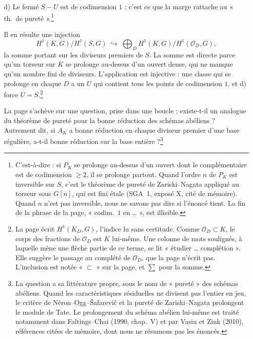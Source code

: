 \documentclass[11pt,a4paper]{article}
\begin{document}
d) Le fermé $S - U$ est de codimension $1$ : c'est ce que la marge rattache au
« th.\ de pureté ».\footnote{C'est-à-dire : si $P_K$ se prolonge au-dessus d'un
ouvert dont le complémentaire est de codimension $\geq 2$, il se prolonge
partout. Quand l'ordre $n$ de $P_K$ est inversible sur $S$, c'est le théorème de
pureté de Zariski--Nagata appliqué au torseur sous $G[n]$, qui est fini étale
(SGA~1, exposé X, cité de mémoire). Quand $n$ n'est pas inversible, nous ne
savons pas dire si l'énoncé tient. La fin de la phrase de la page,
« codim.~$1$ en … », est illisible.}

Il en résulte une injection
\[
  H^{1}(K, G) / H^{1}(S, G) \;\hookrightarrow\;
  \bigoplus_{D} H^{1}(K, G) / H^{1}(\mathcal{O}_D, G),
\]
la somme portant sur les diviseurs premiers de $S$. La somme est directe parce
qu'un torseur sur $K$ se prolonge au-dessus d'un ouvert dense, qui ne manque
qu'un nombre fini de diviseurs. L'application est injective : une classe qui
se prolonge en chaque $D$ a un $U$ qui contient tous les points de codimension
$1$, et d) force $U = S$.\footnote{La page écrit $H^{1}(K_D, G)$, l'indice lu
sans certitude. Comme $\mathcal{O}_D \subset K$, le corps des fractions de
$\mathcal{O}_D$ est $K$ lui-même. Une colonne de mots soulignés, à laquelle
mène une flèche partie de ce terme, se lit « étudier … complétion ». Elle
suggère le passage au complété de $\mathcal{O}_D$, que la page n'écrit pas.
L'inclusion est notée « $\subset$ » sur la page, et $\sum$ pour la somme.}

La page s'achève sur une question, prise dans une boucle : existe-t-il un
analogue du théorème de pureté pour la bonne réduction des schémas abéliens ?
Autrement dit, si $A_K$ a bonne réduction en chaque diviseur premier d'une base
régulière, a-t-il bonne réduction sur la base entière ?\footnote{La question a
sa littérature propre, sous le nom de « pureté » des schémas abéliens. Quand les
caractéristiques résiduelles ne divisent pas l'entier en jeu, le critère de
Néron--Ogg--Šafarevič et la pureté de Zariski--Nagata prolongent le module de
Tate. Le prolongement du schéma abélien lui-même est traité notamment dans
Faltings--Chai (1990, chap.~V) et par Vasiu et Zink (2010), références citées
de mémoire, dont nous ne résumons pas les énoncés.}
\end{document}
